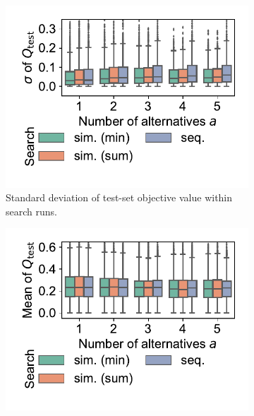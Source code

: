 \documentclass{article}
\theoremstyle{definition}
\begin{document}
\begin{figure}[p]
\begin{subfigure}[t]{0.48\textwidth}
		\label{fig:afs:impact-search-mean-train-objective}
	\end{subfigure}
	\\ \vspace{\baselineskip}
	\begin{subfigure}[t]{0.48\textwidth}
		\centering
		\includegraphics[width=\textwidth, trim=15 25 15 15, clip]{plots/impact-search-stddev-test-objective.pdf}
		\caption{Standard deviation of test-set objective value within search runs.}
		\label{fig:afs:impact-search-stddev-test-objective}
	\end{subfigure}
	\hfill
	\begin{subfigure}[t]{0.48\textwidth}
		\centering
		\includegraphics[width=\textwidth, trim=15 25 15 15, clip]{plots/impact-search-mean-test-objective.pdf}

\end{subfigure}
\end{figure}
\end{document}
